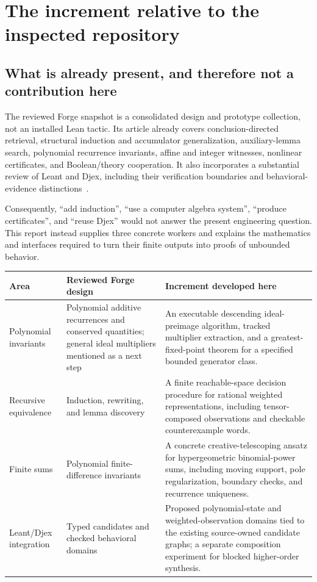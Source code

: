 \section{The increment relative to the inspected repository}
\label{sec:delta}

\subsection{What is already present, and therefore not a contribution here}

The reviewed Forge snapshot is a consolidated design and prototype collection,
not an installed Lean tactic. Its article already covers conclusion-directed
retrieval, structural induction and accumulator generalization, auxiliary-lemma
search, polynomial recurrence invariants, affine and integer witnesses,
nonlinear certificates, and Boolean/theory cooperation. It also incorporates a
substantial review of Leant and Djex, including their verification boundaries
and behavioral-evidence distinctions~\cite{forge,forge-structural,forge-provenance,forge-neighbors}.

Consequently, ``add induction'', ``use a computer algebra system'', ``produce
certificates'', and ``reuse Djex'' would not answer the present engineering
question. This report instead supplies three concrete workers and explains the
mathematics and interfaces required to turn their finite outputs into proofs of
unbounded behavior.

\begin{longtable}{@{}p{}p{}p{}@{}}
\toprule
Area & Reviewed Forge design & Increment developed here \\
\midrule\endhead
Polynomial invariants & Polynomial additive recurrences and conserved quantities;
general ideal multipliers mentioned as a next step & An executable descending
ideal-preimage algorithm, tracked multiplier extraction, and a greatest-fixed-point
theorem for a specified bounded generator class. \\
Recursive equivalence & Induction, rewriting, and lemma discovery & A finite
reachable-space decision procedure for rational weighted representations,
including tensor-composed observations and checkable counterexample words. \\
Finite sums & Polynomial finite-difference invariants & A concrete
creative-telescoping ansatz for hypergeometric binomial-power sums, including
moving support, pole regularization, boundary checks, and recurrence uniqueness. \\
Leant/Djex integration & Typed candidates and checked behavioral domains &
Proposed polynomial-state and weighted-observation domains tied to the existing
source-owned candidate graphs; a separate composition experiment for blocked
higher-order synthesis. \\
\bottomrule
\end{longtable}


